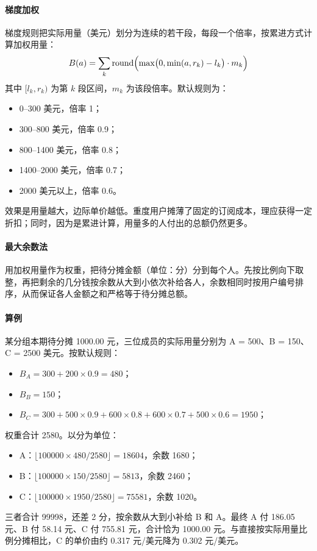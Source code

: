 \paragraph{梯度加权}
梯度规则把实际用量（美元）划分为连续的若干段，每段一个倍率，按累进方式计算加权用量：
\[
B(a) = \sum_k \operatorname{round}\Bigl(\max\bigl(0, \min(a, r_k) - l_k\bigr)\cdot m_k\Bigr)
\]
其中 $[l_k, r_k)$ 为第 $k$ 段区间，$m_k$ 为该段倍率。默认规则为：
\begin{itemize}
  \item 0–300 美元，倍率 1；
  \item 300–800 美元，倍率 0.9；
  \item 800–1400 美元，倍率 0.8；
  \item 1400–2000 美元，倍率 0.7；
  \item 2000 美元以上，倍率 0.6。
\end{itemize}
效果是用量越大，边际单价越低。重度用户摊薄了固定的订阅成本，理应获得一定折扣；同时，因为是累进计算，用量多的人付出的总额仍然更多。

\paragraph{最大余数法}
用加权用量作为权重，把待分摊金额（单位：分）分到每个人。先按比例向下取整，再把剩余的几分钱按余数从大到小依次补给各人，余数相同时按用户编号排序，从而保证各人金额之和严格等于待分摊总额。

\paragraph{算例}
某分组本期待分摊 1000.00 元，三位成员的实际用量分别为 A = 500、B = 150、C = 2500 美元。按默认规则：
\begin{itemize}
  \item $B_A = 300 + 200\times0.9 = 480$；
  \item $B_B = 150$；
  \item $B_C = 300 + 500\times0.9 + 600\times0.8 + 600\times0.7 + 500\times0.6 = 1950$；
\end{itemize}
权重合计 2580。以分为单位：
\begin{itemize}
  \item A：$\lfloor 100000\times480/2580\rfloor = 18604$，余数 1680；
  \item B：$\lfloor 100000\times150/2580\rfloor = 5813$，余数 2460；
  \item C：$\lfloor 100000\times1950/2580\rfloor = 75581$，余数 1020。
\end{itemize}
三者合计 99998，还差 2 分，按余数从大到小补给 B 和 A。最终 A 付 186.05 元、B 付 58.14 元、C 付 755.81 元，合计恰为 1000.00 元。与直接按实际用量比例分摊相比，C 的单价由约 0.317 元/美元降为 0.302 元/美元。

